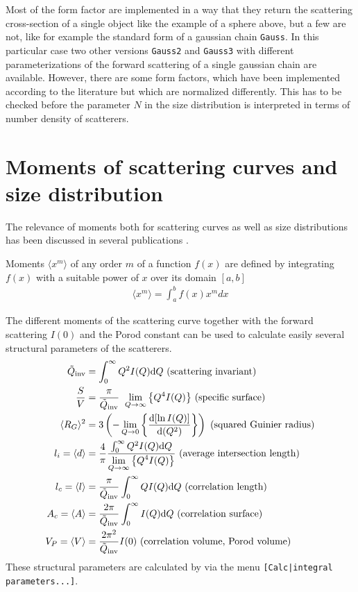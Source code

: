 Most of the form factor are implemented in a way that they return
the scattering cross-section of a single object like the example of
a sphere above, but a few are not, like for example the standard
form of a gaussian chain \texttt{Gauss}. In this particular case two
other versions \texttt{Gauss2} and \texttt{Gauss3} with different
parameterizations of the forward scattering of a single gaussian
chain are available. However, there are some form factors, which
have been implemented according to the literature but which are
normalized differently. This has to be checked before the parameter
$N$ in the size distribution is interpreted in terms of number
density of scatterers.

\section{Moments of scattering curves and size distribution}
\label{sec:SASmoments}

The relevance of moments both for scattering curves as well as size
distributions has been discussed in several publications
\cite{Damaschun1969,Sjoberg1974,Damaschun1971,Walter1985,Moller1995,book:Guinier:Fournet}.

Moments $ \langle x^m\rangle$ of any order $m$ of a function $f(x)$
are defined by integrating $f(x)$  with a suitable power of $x$ over
its domain $[a,b]$
\begin{align}
 \langle x^m\rangle = \displaystyle  \int_a^b f(x) x^m dx
\end{align}

The different moments of the scattering curve together with the
forward scattering $I(0)$ and the Porod constant can be used to
calculate easily several structural parameters of the scatterers.
\begin{subequations}
\begin{align}
\tilde{Q}_\text{inv} &= \int_0^\infty Q^2I(Q) \mathrm{d}Q \mbox{ (scattering invariant)} \\
\frac{S}{V} &= \frac{\pi}{\tilde{Q}_\text{inv}} \;\; {\DS\lim_{Q \to \infty}\left\{Q^4I(Q)\right\}} \mbox{ (specific surface)} \\
\langle R_G \rangle^2 &= 3\left(-\DS\lim_{Q \to 0}\left\{\frac{\mathrm{d}[\ln I(Q)]}{\mathrm{d}(Q^2)}\right\}\right) \mbox{ (squared Guinier radius)} \\
l_i=\langle d \rangle &= \frac{4}{\pi}\frac{\int_0^\infty Q^2I(Q) \mathrm{d}Q}{\DS\lim_{Q \to \infty}\left\{Q^4I(Q)\right\}} \mbox{ (average intersection length)} \\
l_c=\langle l \rangle &= \frac{\pi}{\tilde{Q}_\text{inv}} \int_0^\infty QI(Q) \mathrm{d}Q \mbox{ (correlation length)} \\
A_c=\langle A \rangle &= \frac{2\pi}{\tilde{Q}_\text{inv}}\int_0^\infty I(Q) \mathrm{d}Q \mbox{ (correlation surface)} \\
V_P=\langle V \rangle &= \frac{2\pi^2}{\tilde{Q}_\text{inv}} I(0)
\mbox{ (correlation volume, Porod volume)}
\end{align}
\end{subequations}
These structural parameters are calculated by \SASfit via the menu
\texttt{[Calc|integral parameters...]}.



